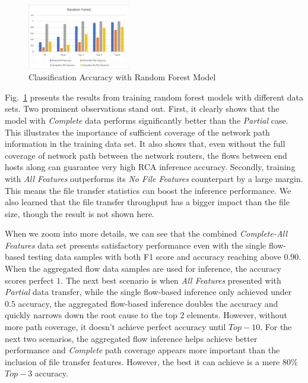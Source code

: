 \begin{figure}[!ht]
\begin{center}
\includegraphics[width=0.4\textwidth]{./figure/rf-accuracy}
\end{center}
\caption{Classification Accuracy with Random Forest Model}
\label{fig:dt}
\end{figure}

Fig.~\ref{fig:dt} presents the results from training random forest models with different data sets. Two prominent observations stand out. 
First, it clearly shows that the model with {\it Complete} data performs significantly better than the {\it Partial} case. This illustrates the importance of sufficient 
coverage of the network path information in the training data set. It also shows that, even without the full coverage of network path between the network routers, 
the flows between end hosts along can guarantee very high RCA inference accuracy.   
Secondly, training with {\it All Features} outperforms its {\it No File Features} counterpart by a large margin. This means the file transfer statistics can boost the inference performance.  
We also learned that the file transfer throughput has a bigger impact than the file size, though the result is not shown here. 

When we zoom into more details, we can see that the combined {\it Complete-All Features} data set presents satisfactory performance even with the single flow-based testing data samples with 
both F1 score and accuracy reaching above $0.90$. When the aggregated flow data samples are used for inference, the accuracy scores perfect $1$. The next best scenario is when {\it All Features} presented with 
{\it Partial} data transfer, while the single flow-based inference only achieved under $0.5$ accuracy, the aggregated flow-based inference doubles the accuracy and quickly narrows down the root cause to the 
top $2$ elements. However, without more path coverage, it doesn't achieve perfect accuracy until $Top-10$. For the next two scenarios, the aggregated flow inference helps achieve better performance 
and {\it Complete} path coverage appears more important than the inclusion of file transfer features. However, the best it can achieve is a mere $80\%$ $Top-3$ accuracy.  

